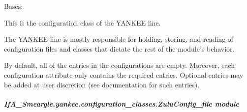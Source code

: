 \documentclass[letterpaper,10pt,english]{sphinxmanual}
\begin{document}
\begin{fulllineitems}
\label{\detokenize{python_docstrings/IfA_Smeargle.yankee.configuration_classes.YankeeConfig_file:IfA_Smeargle.yankee.configuration_classes.YankeeConfig_file.YankeeConfig}}
Bases: {\hyperref[\detokenize{python_docstrings/IfA_Smeargle.yankee.configuration_classes.BaseConfig_file:IfA_Smeargle.yankee.configuration_classes.BaseConfig_file.BaseConfig}]{}}

This is the configuration class of the YANKEE line.

The YANKEE line is mostly responsible for holding, storing, and reading
of configuration files and classes that dictate the rest  of the module’s
behavior.

By default, all of the entries in the configurations are empty. Moreover,
each configuration attribute only contains the required entries. Optional
entries may be added at user  discretion (see documentation for such
entries).

\end{fulllineitems}



\subparagraph{IfA\_Smeargle.yankee.configuration\_classes.ZuluConfig\_file module}
\label{\detokenize{python_docstrings/IfA_Smeargle.yankee.configuration_classes.ZuluConfig_file:module-IfA_Smeargle.yankee.configuration_classes.ZuluConfig_file}}\label{\detokenize{python_docstrings/IfA_Smeargle.yankee.configuration_classes.ZuluConfig_file:ifa-smeargle-yankee-configuration-classes-zuluconfig-file-module}}\label{\detokenize{python_docstrings/IfA_Smeargle.yankee.configuration_classes.ZuluConfig_file::doc}}
\end{document}
